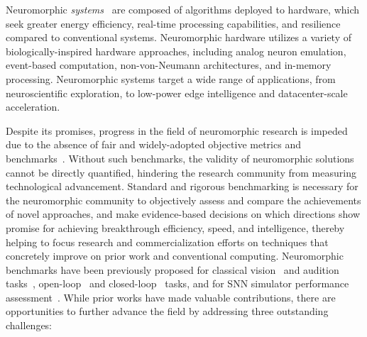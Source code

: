 Neuromorphic \textit{systems}~\cite{frenkel23bottom} are composed of algorithms deployed to hardware, which seek greater energy efficiency, real-time processing capabilities, and resilience compared to conventional systems. Neuromorphic hardware utilizes a variety of biologically-inspired hardware approaches, including analog neuron emulation, event-based computation, non-von-Neumann architectures, and in-memory processing. Neuromorphic systems target a wide range of applications, from neuroscientific exploration, to low-power edge intelligence and datacenter-scale acceleration.

Despite its promises, progress in the field of neuromorphic research is impeded due to the absence of fair and widely-adopted objective metrics and benchmarks~\cite{Davies19_bencprog, Schuman2022}. Without such benchmarks, the validity of neuromorphic solutions cannot be directly quantified, hindering the research community from measuring technological advancement.
Standard and rigorous benchmarking is necessary for the neuromorphic community to objectively assess and compare the achievements of novel approaches, and make evidence-based decisions on which directions show promise for achieving breakthrough efficiency, speed, and intelligence, thereby helping to focus research and commercialization efforts on techniques that concretely improve on prior work and conventional computing. Neuromorphic benchmarks have been previously proposed for classical vision~\cite{orchard2015converting,Amir_etal17_lowpowe} and audition tasks~\cite{Cramer_2022}, open-loop~\cite{Ostrau2022} and closed-loop~\cite{closedloop-andre} tasks, and for SNN simulator performance assessment~\cite{KULKARNI2021}. While prior works have made valuable contributions, there are opportunities to further advance the field by addressing three outstanding challenges:


